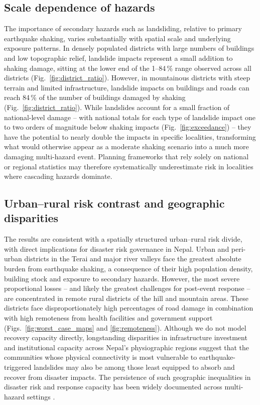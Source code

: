 \documentclass[nhess, manuscript]{copernicus}
\begin{document}
\subsection{Scale dependence of hazards}

The importance of secondary hazards such as landsliding, relative to primary earthquake shaking, varies substantially with spatial scale and underlying exposure patterns. In densely populated districts with large numbers of buildings and low topographic relief, landslide impacts represent a small addition to shaking damage, sitting at the lower end of the 1--84\,\% range observed across all districts (Fig.~\ref{fig:district_ratio}). However, in mountainous districts with steep terrain and limited infrastructure, landslide impacts on buildings and roads can reach 84\,\% of the number of buildings damaged by shaking (Fig.~\ref{fig:district_ratio}). While landslides account for a small fraction of national-level damage -- with national totals for each type of landslide impact one to two orders of magnitude below shaking impacts (Fig.~\ref{fig:exceedance}) -- they have the potential to nearly double the impacts in specific localities, transforming what would otherwise appear as a moderate shaking scenario into a much more damaging multi-hazard event. Planning frameworks that rely solely on national or regional statistics may therefore systematically underestimate risk in localities where cascading hazards dominate.

\subsection{Urban--rural risk contrast and geographic disparities}

The results are consistent with a spatially structured urban--rural risk divide, with direct implications for disaster risk governance in Nepal. Urban and peri-urban districts in the Terai and major river valleys face the greatest absolute burden from earthquake shaking, a consequence of their high population density, building stock and exposure to secondary hazards. However, the most severe proportional losses -- and likely the greatest challenges for post-event response -- are concentrated in remote rural districts of the hill and mountain areas. These districts face disproportionately high percentages of road damage in combination with high remoteness from health facilities and government support (Figs.~\ref{fig:worst_case_maps} and \ref{fig:remoteness}). Although we do not model recovery capacity directly, longstanding disparities in infrastructure investment and institutional capacity across Nepal's physiographic regions \citep{NationalPlanningCommission2014} suggest that the communities whose physical connectivity is most vulnerable to earthquake-triggered landslides may also be among those least equipped to absorb and recover from disaster impacts. The persistence of such geographic inequalities in disaster risk and response capacity has been widely documented across multi-hazard settings \citep{Wisner2004}.
\end{document}
